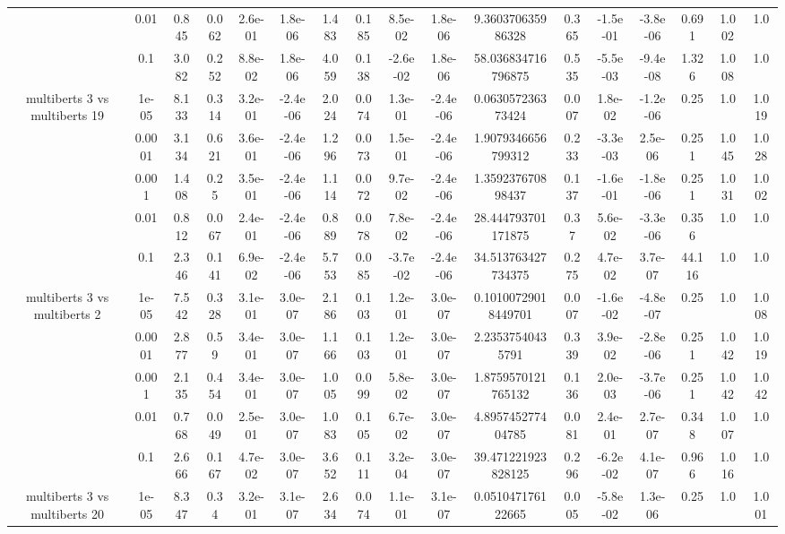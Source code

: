 \begin{tabular}{|c|c|c|c|c|c|c|c|c|c|c|c|c|c|c|c|c|}
 & 0.01 & 0.845 & 0.062 & 2.6e-01 & 1.8e-06 & 1.483 & 0.185 & 8.5e-02 & 1.8e-06 & 9.360370635986328 & 0.365 & -1.5e-01 & -3.8e-06 & 0.691 & 1.002 & 1.0 \\
 & 0.1 & 3.082 & 0.252 & 8.8e-02 & 1.8e-06 & 4.059 & 0.138 & -2.6e-02 & 1.8e-06 & 58.036834716796875 & 0.535 & -5.5e-03 & -9.4e-08 & 1.326 & 1.008 & 1.0 \\
\hline
\multirow{5}{*}{multiberts 3 vs multiberts 19} & 1e-05 & 8.133 & 0.314 & 3.2e-01 & -2.4e-06 & 2.024 & 0.074 & 1.3e-01 & -2.4e-06 & 0.063057236373424 & 0.007 & 1.8e-02 & -1.2e-06 & 0.25 & 1.0 & 1.019 \\
 & 0.0001 & 3.134 & 0.621 & 3.6e-01 & -2.4e-06 & 1.296 & 0.073 & 1.5e-01 & -2.4e-06 & 1.9079346656799312 & 0.233 & -3.3e-03 & 2.5e-06 & 0.251 & 1.045 & 1.028 \\
 & 0.001 & 1.408 & 0.25 & 3.5e-01 & -2.4e-06 & 1.114 & 0.072 & 9.7e-02 & -2.4e-06 & 1.359237670898437 & 0.137 & -1.6e-01 & -1.8e-06 & 0.251 & 1.031 & 1.002 \\
 & 0.01 & 0.812 & 0.067 & 2.4e-01 & -2.4e-06 & 0.889 & 0.078 & 7.8e-02 & -2.4e-06 & 28.444793701171875 & 0.37 & 5.6e-02 & -3.3e-06 & 0.356 & 1.0 & 1.0 \\
 & 0.1 & 2.346 & 0.141 & 6.9e-02 & -2.4e-06 & 5.753 & 0.085 & -3.7e-02 & -2.4e-06 & 34.513763427734375 & 0.275 & 4.7e-02 & 3.7e-07 & 44.116 & 1.0 & 1.0 \\
\hline
\multirow{5}{*}{multiberts 3 vs multiberts 2} & 1e-05 & 7.542 & 0.328 & 3.1e-01 & 3.0e-07 & 2.186 & 0.103 & 1.2e-01 & 3.0e-07 & 0.10100729018449701 & 0.007 & -1.6e-02 & -4.8e-07 & 0.25 & 1.0 & 1.008 \\
 & 0.0001 & 2.877 & 0.59 & 3.4e-01 & 3.0e-07 & 1.166 & 0.103 & 1.2e-01 & 3.0e-07 & 2.23537540435791 & 0.339 & 3.9e-02 & -2.8e-06 & 0.251 & 1.042 & 1.019 \\
 & 0.001 & 2.135 & 0.454 & 3.4e-01 & 3.0e-07 & 1.005 & 0.099 & 5.8e-02 & 3.0e-07 & 1.8759570121765132 & 0.136 & 2.0e-03 & -3.7e-06 & 0.251 & 1.042 & 1.042 \\
 & 0.01 & 0.768 & 0.049 & 2.5e-01 & 3.0e-07 & 1.083 & 0.105 & 6.7e-02 & 3.0e-07 & 4.895745277404785 & 0.081 & 2.4e-01 & 2.7e-07 & 0.348 & 1.007 & 1.0 \\
 & 0.1 & 2.666 & 0.167 & 4.7e-02 & 3.0e-07 & 3.652 & 0.111 & 3.2e-04 & 3.0e-07 & 39.471221923828125 & 0.296 & -6.2e-02 & 4.1e-07 & 0.966 & 1.016 & 1.0 \\
\hline
\multirow{5}{*}{multiberts 3 vs multiberts 20} & 1e-05 & 8.347 & 0.34 & 3.2e-01 & 3.1e-07 & 2.634 & 0.074 & 1.1e-01 & 3.1e-07 & 0.051047176122665 & 0.005 & -5.8e-02 & 1.3e-06 & 0.25 & 1.0 & 1.001 \\

\end{tabular}
